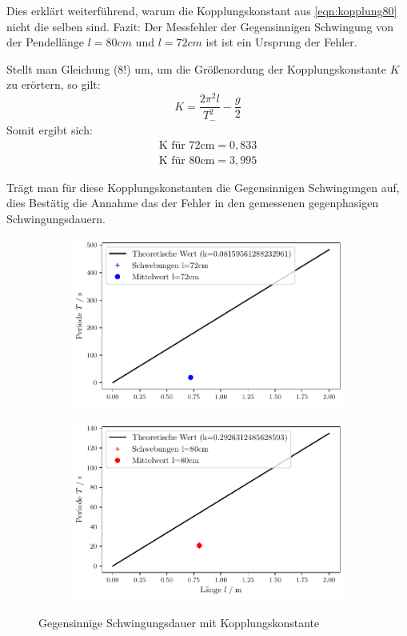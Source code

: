 Dies erklärt weiterführend, warum die Kopplungskonstant aus \ref{eqn:kopplung80} nicht die selben
sind.
Fazit: Der Messfehler der Gegensinnigen Schwingung von der Pendellänge $l=80cm$ und $l=72cm$ ist 
ist ein Ursprung der Fehler.

Stellt man Gleichung (8!) um, um die Größenordung der Kopplungskonstante $K$ zu erörtern, so gilt:
\begin{equation}
    K=\frac{2\pi^2l}{T_{-}^2}-\frac{g}{2}
\end{equation}
Somit ergibt sich:
\begin{align*}
    \textrm{K für 72cm} = 0,833\\
    \textrm{K für 80cm} = 3,995 
\end{align*}

Trägt man für diese Kopplungskonstanten die Gegensinnigen Schwingungen auf, dies Bestätig die Annahme
das der Fehler in den gemessenen gegenphasigen Schwingungsdauern.  
\begin{figure}
    \begin{subfigure}[c]{0.5\textwidth}
        \includegraphics[width=\textwidth]{plots/plot4.pdf}
    \end{subfigure}
    \begin{subfigure}[c]{0.5\textwidth}
        \includegraphics[width=\textwidth]{plots/plot5.pdf}
        \label{subfig:gegenNEU80}
    \end{subfigure}
    \caption{Gegensinnige Schwingungsdauer mit Kopplungskonstante}
\end{figure}


